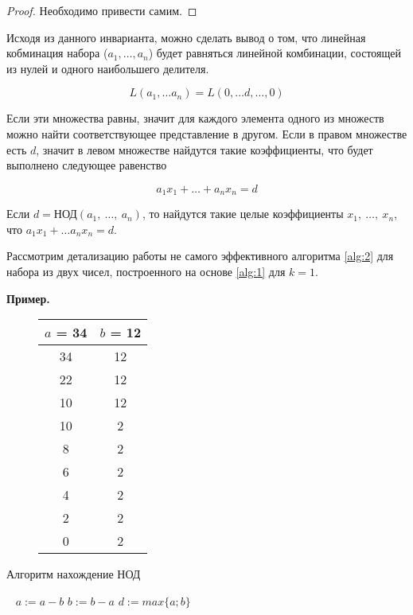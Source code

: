 \documentclass[russian]{lecture-notes}
\begin{document}
\begin{proof}
    Необходимо привести самим.
\end{proof}


Исходя из данного инварианта, можно сделать вывод о том, что линейная кобминация набора ($a_1, \ldots, a_n$) будет равняться линейной комбинации, состоящей из нулей и одного наибольшего делителя.

\[L (a_1,\ldots a_n ) = L (0,\ldots d,\ldots,0 )\]

Если эти множества равны, значит для каждого элемента одного из множеств можно найти соответствующее представление в другом. Если в правом множестве есть $d$, значит в левом множестве найдутся такие коэффициенты, что будет выполнено следующее равенство

\begin{equation*}
    a_1x_1 + \ldots + a_nx_n = d
\end{equation*}

\begin{theorem}
    Если $d = \text{НОД} (a_1, \ \ldots, \ a_n)$, то найдутся такие целые коэффициенты $x_1, \ \dotsc, \ x_n$, что ${a_1x_1 + \ldots a_nx_n = d}$.
\end{theorem}

Рассмотрим детализацию работы не самого эффективного алгоритма \ref{alg:2} для набора из двух чисел, построенного на основе \ref{alg:1} для $k = 1$.

\textbf{Пример.}
\begin{figure}[h!]
    \centering
    \begin{tabular}{| c | c |}
    \hline
    $a$ = 34 & $b$ = 12\\
    \hline
        34 & 12\\
        22 & 12 \\
        10 & 12 \\
        10 & 2 \\
        8 & 2 \\
        6 & 2 \\
        4 & 2 \\
        2 & 2 \\
        0 & 2 \\
    \hline
    \end{tabular}
\end{figure}

\begin{algorithm}[H]
	\caption{Алгоритм нахождение НОД}
	\begin{algorithmic}[1]
	    \
    	        \State $a := a - b$
    	    \EndIf
    	        \State $b := b - a$
    	    \EndIf
	    \EndWhile
	    \State $d := max \{a;b\}$
	\end{algorithmic}
	\label{alg:2}
\end{algorithm}
\end{document}
